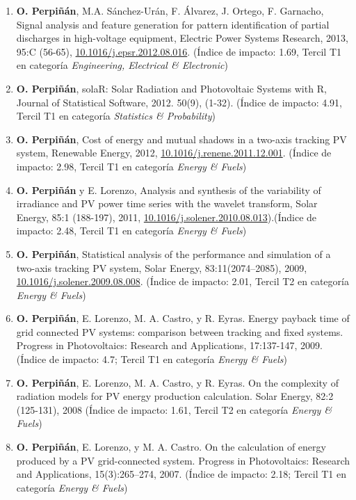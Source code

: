 \documentclass[article, a4paper]{memoir}
\begin{document}
\begin{enumerate}
\item \textbf{O. Perpiñán}, M.A. Sánchez-Urán, F. Álvarez, J. Ortego,
F. Garnacho, Signal analysis and feature generation for pattern
identification of partial discharges in high-voltage equipment,
Electric Power Systems Research, 2013, 95:C (56-65),
\href{http://dx.doi.org/10.1016/j.epsr.2012.08.016}{10.1016/j.epsr.2012.08.016}. (Índice de impacto: 1.69, Tercil T1 en
categoría \emph{Engineering, Electrical \& Electronic})

\item \textbf{O. Perpiñán}, solaR: Solar Radiation and Photovoltaic Systems
with R, Journal of Statistical Software, 2012. 50(9),
(1-32). (Índice de impacto: 4.91, Tercil T1 en categoría
\emph{Statistics \& Probability})

\item \textbf{O. Perpiñán}, Cost of energy and mutual shadows in a two-axis
tracking PV system, Renewable Energy, 2012,
\href{http://dx.doi.org/10.1016/j.renene.2011.12.001}{10.1016/j.renene.2011.12.001}. (Índice de impacto: 2.98, Tercil T1
en categoría \emph{Energy \& Fuels})

\item \textbf{O. Perpiñán} y E. Lorenzo, Analysis and synthesis of the
variability of irradiance and PV power time series with the
wavelet transform, Solar Energy, 85:1 (188-197), 2011,
\href{http://dx.doi.org/10.1016/j.solener.2010.08.013}{10.1016/j.solener.2010.08.013}).(Índice de impacto: 2.48, Tercil T1
en categoría \emph{Energy \& Fuels})

\item \textbf{O. Perpiñán}, Statistical analysis of the performance and
simulation of a two-axis tracking PV system, Solar Energy,
83:11(2074–2085), 2009, \href{http://dx.doi.org/10.1016/j.solener.2009.08.008}{10.1016/j.solener.2009.08.008}. (Índice de
impacto: 2.01, Tercil T2 en categoría \emph{Energy \& Fuels})

\item \textbf{O. Perpiñán}, E. Lorenzo, M. A. Castro, y R. Eyras. Energy
payback time of grid connected PV systems: comparison between
tracking and fixed systems. Progress in Photovoltaics: Research
and Applications, 17:137-147, 2009. (Índice de impacto: 4.7;
Tercil T1 en categoría \emph{Energy \& Fuels})

\item \textbf{O. Perpiñán}, E. Lorenzo, M. A. Castro, y R. Eyras. On the
complexity of radiation models for PV energy production
calculation. Solar Energy, 82:2 (125-131), 2008 (Índice de
impacto: 1.61, Tercil T2 en categoría \emph{Energy \& Fuels})

\item \textbf{O. Perpiñán}, E. Lorenzo, y M. A. Castro. On the calculation of
energy produced by a PV grid-connected system. Progress in
Photovoltaics: Research and Applications,
15(3):265–274, 2007. (Índice de impacto: 2.18; Tercil T1 en
categoría \emph{Energy \& Fuels})
\end{enumerate}
\end{document}
